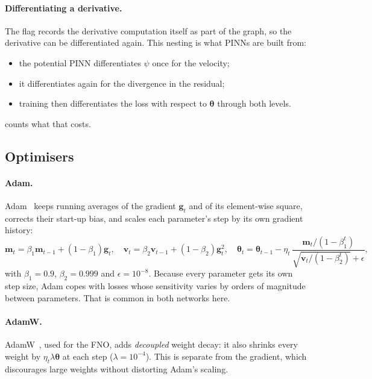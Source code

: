 \paragraph{Differentiating a derivative.}
The flag  records the derivative computation itself as part of the graph,
so the derivative can be differentiated again. This nesting is what PINNs are built from:
\begin{itemize}
  \item the potential PINN differentiates $\psi$ once for the velocity;
  \item it differentiates again for the divergence in the residual;
  \item training then differentiates the loss with respect to $\bm\theta$ through both levels.
\end{itemize}
 counts what that costs.

\subsection{Optimisers}

\paragraph{Adam.}
Adam~\cite{kingma2015adam} keeps running averages of the gradient $\bm g_t$ and of its element-wise
square, corrects their start-up bias, and scales each parameter's step by its own gradient history:
\begin{equation}
  \bm m_t = \beta_1\bm m_{t-1} + (1-\beta_1)\bm g_t,\quad
  \bm v_t = \beta_2\bm v_{t-1} + (1-\beta_2)\bm g_t^2,\quad
  \bm\theta_t = \bm\theta_{t-1} - \eta_t\,\frac{\bm m_t/(1-\beta_1^t)}{\sqrt{\bm v_t/(1-\beta_2^t)} + \epsilon},
  \label{eq:adam}
\end{equation}
with $\beta_1 = 0.9$, $\beta_2 = 0.999$ and $\epsilon = 10^{-8}$. Because every parameter gets its
own step size, Adam copes with losses whose sensitivity varies by orders of magnitude between
parameters. That is common in both networks here.

\paragraph{AdamW.}
AdamW~\cite{loshchilov2019adamw}, used for the FNO, adds \emph{decoupled} weight decay: it also
shrinks every weight by $\eta_t\lambda\bm\theta$ at each step ($\lambda = 10^{-4}$). This is
separate from the gradient, which discourages large weights without distorting Adam's scaling.

